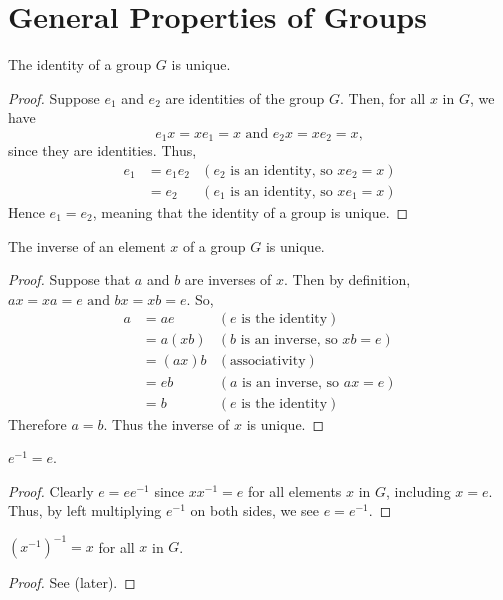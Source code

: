 \section{General Properties of Groups}
\begin{proposition}
    The identity of a group $G$ is unique.
\end{proposition}
\begin{proof}
    Suppose $e_1$ and $e_2$ are identities of the group $G$. Then, for all $x$ in $G$, we have
    \[
        e_1x = xe_1 = x \text{ and } e_2x = xe_2 = x,
    \]
    since they are identities. Thus,
    \begin{align*}
        e_1 &= e_1e_2 & (e_2 \text{ is an identity, so } xe_2 = x)\\
        &= e_2 & (e_1 \text{ is an identity, so } xe_1 = x)
    \end{align*}
    Hence $e_1 = e_2$, meaning that the identity of a group is unique.
\end{proof}

\begin{proposition}
    The inverse of an element $x$ of a group $G$ is unique.
\end{proposition}
\begin{proof}
    Suppose that $a$ and $b$ are inverses of $x$. Then by definition, $ax = xa = e \text{ and } bx = xb = e$. So,
    \begin{align*}
        a &= ae & (e \text{ is the identity})\\
        &= a(xb) & (b \text{ is an inverse, so } xb = e)\\
        &= (ax)b & (\text{associativity})\\
        &= eb & (a \text{ is an inverse, so } ax = e)\\
        &= b & (e \text{ is the identity})
    \end{align*}
    Therefore $a = b$. Thus the inverse of $x$ is unique.
\end{proof}

\begin{proposition}\label{prop-inverse-of-identity-is-identity}
    $e^{-1} = e$.
\end{proposition}
\begin{proof}
    Clearly $e = ee^{-1}$ since $xx^{-1} = e$ for all elements $x$ in $G$, including $x = e$. Thus, by left multiplying $e^{-1}$ on both sides, we see $e = e^{-1}$.
\end{proof}

\begin{proposition}
    $\left(x^{-1}\right)^{-1} = x$ for all $x$ in $G$.
\end{proposition}
\begin{proof}
    See  (later).
\end{proof}

